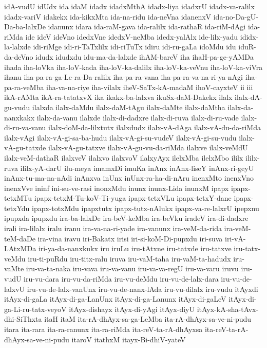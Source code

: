{idA-vudU
idUdx
ida
idaM
idadx
idadxMthA
idadx-liya
idadxrU
idadx-va-ralilx
idadx-variV
idakekx
ida-kikxMta
ida-na-ridu
ida-neVna
idanenxV
ida-no-Da-gU-Da-ba-lalxDe
idanunx
idara
ida-raM-gava
ida-ralilx
ida-rathaR
ida-riM-dAgi
ida-riMda
ide
ideV
ideVno
idedxVne
idedxV-neMba
idedx-yalAlx
ide-lilx-yadu
ididx-la-lalxde
idi-riMge
idi-ri-TaTxlilx
idi-riTuTx
idiru
idi-ru-gaLa
idoMdu
idu
iduR-da-deVno
idudx
idudxdu
idu-ma-da-lalxde
ihAM-bareV
iha
ihaH-pa-ge-yAMDa
ihada
iha-loVka
iha-loV-kada
iha-loV-ka-dalilx
iha-loV-ka-veVnu
iha-loV-ka-viVra
ihanu
iha-pa-ra-ga-Le-ra-Da-ralilx
iha-pa-ra-vana
iha-pa-ra-va-na-ri-ya-nAgi
iha-pa-ra-veMba
iha-va-na-riye
iha-vilalx
iheV-SaTx-kA-madaM
ihoV-cayxteV
ii
iii
ikA-rAMta
ikA-ra-tatatxvX
ika
ikakx-ba-lalxva
ikuSx-daM-Dakekx
ilalx
ilalx-dA-gu-vudu
ilalxda
ilalx-daMdu
ilalx-daM-tAgu
ilalx-daMte
ilalx-daMtha
ilalx-da-nanxkakx
ilalx-da-vanu
ilalxde
ilalx-di-dadxre
ilalx-di-ruva
ilalx-di-ru-vade
ilalx-di-ru-va-vanu
ilalx-doM-da-lilxtutx
ilalxdudx
ilalx-vA-dAga
ilalx-vA-du-da-riMda
ilalx-vAgi
ilalx-vA-gi-sa-ba-hudu
ilalx-vA-gi-su-vudeV
ilalx-vA-gi-su-vudu
ilalx-vA-gu-tatxde
ilalx-vA-gu-tatxve
ilalx-vA-gu-vu-da-riMda
ilalxve
ilalx-veMdU
ilalx-veM-dathaR
ilalxveV
ilalxvo
ilalxvoV
ilalxyAyx
ilelxMba
ilelxMbo
ililx
ililx-ruva
ililx-yA-darU
ilu-meya
imamxDi
imuKa
inAnx
inAnx-liseY
inAnx-ri-geyU
inAnx-tu-ma-na-nAdi
inAnxva
inUnx
inUnx-ra-ha-di-nAru
inenxMto
inenxVno
inenxVve
ininf
ini-su-ve-rasi
inonxMdu
inunx
inunx-Lida
inunxM
ipapx
ipapx-tetxMTu
ipapx-tetxM-Tu-koV-Ti-yuga
ipapx-tetxVLu
ipapx-tetxY-dane
ipapx-tetxYdu
ipapx-totxMdu
ipapxtutx
ipapx-tutx-nAlukx
ipapx-va-re-lalxrU
ipepxnu
ipupxda
ipupxdu
ira-ba-lalxDe
ira-beV-keMba
ira-beVku
iradeV
ira-di-dadxre
irali
ira-lilalx
iralu
iranu
ira-va-na-ri-yade
ira-vanunx
ira-veM-da-rida
ira-veM-teM-daDe
ira-vina
iravu
iri-Bakatx
irisi
iri-si-koM-Di-pupxdu
iri-suva
iri-vA-LAtxMDa
iri-ya-da-nanxkukx
iru
iruLu
iru-tAtxne
iru-tatxde
iru-tatxve
iru-tatx-veMdu
iru-ti-puRdu
iru-titx-ralu
iruva
iru-vaM-taha
iru-vaM-ta-hadudx
iru-vaMte
iru-va-ta-naka
iru-vava
iru-va-vanu
iru-va-va-regU
iru-va-varu
iruvu
iru-vudU
iru-vu-dara
iru-vu-da-riMda
iru-vu-deMdu
iru-vu-de-lalx-dara
iru-vu-de-lalxvU
iru-vu-de-lalx-vanUnx
iru-vu-de-nanx-lAda
iru-vu-dilalx
iru-vudu
itAyxdi
itAyx-di-gaLa
itAyx-di-ga-LanUnx
itAyx-di-ga-Lanunx
itAyx-di-gaLeV
itAyx-di-ga-Li-ru-tatx-veyoV
itAyx-dishayx
itAyx-di-yAgi
itAyx-diyU
itAyx-kA-sha-tAvx-dhi-SiThxta
itaH
itaM
ita-rA-dhAyx-sa-ga-LeMba
ita-rA-dhAyx-sa-ve-ni-pudu
itara
ita-rara
ita-ra-ranunx
ita-ra-riMda
ita-reV-ta-rA-dhAyxsa
ita-reV-ta-rA-dhAyx-sa-ve-ni-pudu
itaroV
itathxM
itayx-Bi-dhiV-yateV
}
